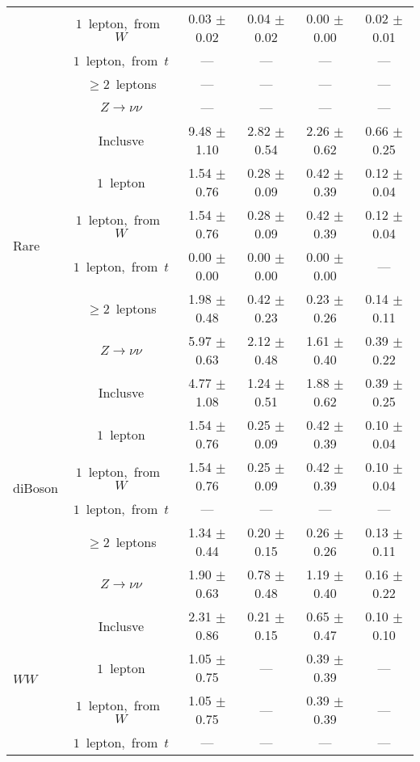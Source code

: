 \documentclass{article}
\begin{document}
\begin{longtable}{|l|c|c|c|c|c|}
 & $1$~lepton,~from~$W$  & 0.03 $\pm$ 0.02  & 0.04 $\pm$ 0.02  & 0.00 $\pm$ 0.00  & 0.02 $\pm$ 0.01 \\* 
 & $1$~lepton,~from~$t$  & ---  & ---  & ---  & --- \\* 
 & $\ge2$~leptons  & ---  & ---  & ---  & --- \\* 
 & $Z\rightarrow\nu\nu$  & ---  & ---  & ---  & --- \\* 
\hline 
\multirow{6}{*}{Rare} & Inclusve  & 9.48 $\pm$ 1.10  & 2.82 $\pm$ 0.54  & 2.26 $\pm$ 0.62  & 0.66 $\pm$ 0.25 \\* 
 & $1$~lepton  & 1.54 $\pm$ 0.76  & 0.28 $\pm$ 0.09  & 0.42 $\pm$ 0.39  & 0.12 $\pm$ 0.04 \\* 
 & $1$~lepton,~from~$W$  & 1.54 $\pm$ 0.76  & 0.28 $\pm$ 0.09  & 0.42 $\pm$ 0.39  & 0.12 $\pm$ 0.04 \\* 
 & $1$~lepton,~from~$t$  & 0.00 $\pm$ 0.00  & 0.00 $\pm$ 0.00  & 0.00 $\pm$ 0.00  & --- \\* 
 & $\ge2$~leptons  & 1.98 $\pm$ 0.48  & 0.42 $\pm$ 0.23  & 0.23 $\pm$ 0.26  & 0.14 $\pm$ 0.11 \\* 
 & $Z\rightarrow\nu\nu$  & 5.97 $\pm$ 0.63  & 2.12 $\pm$ 0.48  & 1.61 $\pm$ 0.40  & 0.39 $\pm$ 0.22 \\* 
\hline 
\multirow{6}{*}{diBoson} & Inclusve  & 4.77 $\pm$ 1.08  & 1.24 $\pm$ 0.51  & 1.88 $\pm$ 0.62  & 0.39 $\pm$ 0.25 \\* 
 & $1$~lepton  & 1.54 $\pm$ 0.76  & 0.25 $\pm$ 0.09  & 0.42 $\pm$ 0.39  & 0.10 $\pm$ 0.04 \\* 
 & $1$~lepton,~from~$W$  & 1.54 $\pm$ 0.76  & 0.25 $\pm$ 0.09  & 0.42 $\pm$ 0.39  & 0.10 $\pm$ 0.04 \\* 
 & $1$~lepton,~from~$t$  & ---  & ---  & ---  & --- \\* 
 & $\ge2$~leptons  & 1.34 $\pm$ 0.44  & 0.20 $\pm$ 0.15  & 0.26 $\pm$ 0.26  & 0.13 $\pm$ 0.11 \\* 
 & $Z\rightarrow\nu\nu$  & 1.90 $\pm$ 0.63  & 0.78 $\pm$ 0.48  & 1.19 $\pm$ 0.40  & 0.16 $\pm$ 0.22 \\* 
\hline 
\multirow{6}{*}{$WW$} & Inclusve  & 2.31 $\pm$ 0.86  & 0.21 $\pm$ 0.15  & 0.65 $\pm$ 0.47  & 0.10 $\pm$ 0.10 \\* 
 & $1$~lepton  & 1.05 $\pm$ 0.75  & ---  & 0.39 $\pm$ 0.39  & --- \\* 
 & $1$~lepton,~from~$W$  & 1.05 $\pm$ 0.75  & ---  & 0.39 $\pm$ 0.39  & --- \\* 
 & $1$~lepton,~from~$t$  & ---  & ---  & ---  & --- \\* 

\end{longtable}
\end{document}
